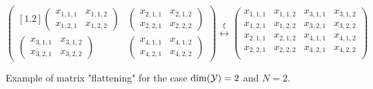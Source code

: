 \begin{figure}
	\begin{equation*}
		\begin{pmatrix}[1.2]
			\begin{pmatrix}
				x_{1, 1, 1} & x_{1, 1, 2}\\
				x_{1, 2, 1} & x_{1, 2, 2}
			\end{pmatrix}
			& \begin{pmatrix}
				x_{2, 1, 1} & x_{2, 1, 2}\\
				x_{2, 2, 1} & x_{2, 2, 2}
			\end{pmatrix}\\
			\begin{pmatrix}
			x_{3, 1, 1} & x_{3, 1, 2}\\
			x_{3, 2, 1} & x_{3, 2, 2}
			\end{pmatrix} 
			& \begin{pmatrix}
			x_{4, 1, 1} & x_{4, 1, 2}\\
			x_{4, 2, 1} & x_{4, 2, 2}
			\end{pmatrix}
		\end{pmatrix}
		\stackrel{\xi}{\longleftrightarrow}
		\begin{pmatrix}
			x_{1, 1, 1} & x_{1, 1, 2} & x_{3, 1, 1} & x_{3, 1, 2} \\
			x_{1, 2, 1} & x_{1, 2, 2} & x_{3, 2, 1} & x_{3, 2, 2} \\
			x_{2, 1, 1} & x_{2, 1, 2} & x_{4, 1, 1} & x_{4, 1, 2} \\
			x_{2, 2, 1} & x_{2, 2, 2} & x_{4, 2, 1} & x_{4, 2, 2} \\
		\end{pmatrix}
	\end{equation*}
	\caption{Example of matrix "flattening" for the case $\mathrm{dim}(\mathcal{Y}) = 2$ and $N = 2$.}
	\label{fig:block-operator-example}
\end{figure}